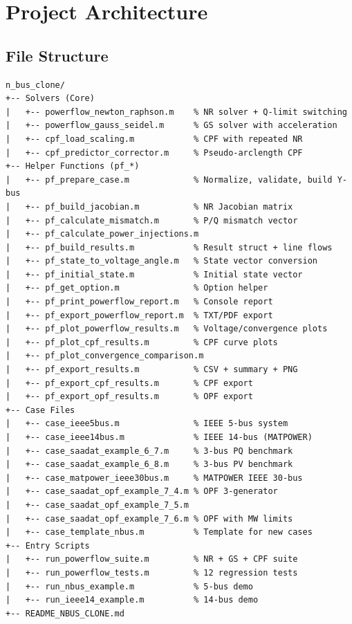 \documentclass[12pt,a4paper]{article}
\begin{document}
\section{Project Architecture}

\subsection{File Structure}

\begin{verbatim}
n_bus_clone/
+-- Solvers (Core)
|   +-- powerflow_newton_raphson.m    % NR solver + Q-limit switching
|   +-- powerflow_gauss_seidel.m      % GS solver with acceleration
|   +-- cpf_load_scaling.m            % CPF with repeated NR
|   +-- cpf_predictor_corrector.m     % Pseudo-arclength CPF
+-- Helper Functions (pf_*)
|   +-- pf_prepare_case.m             % Normalize, validate, build Y-bus
|   +-- pf_build_jacobian.m           % NR Jacobian matrix
|   +-- pf_calculate_mismatch.m       % P/Q mismatch vector
|   +-- pf_calculate_power_injections.m
|   +-- pf_build_results.m            % Result struct + line flows
|   +-- pf_state_to_voltage_angle.m   % State vector conversion
|   +-- pf_initial_state.m            % Initial state vector
|   +-- pf_get_option.m               % Option helper
|   +-- pf_print_powerflow_report.m   % Console report
|   +-- pf_export_powerflow_report.m  % TXT/PDF export
|   +-- pf_plot_powerflow_results.m   % Voltage/convergence plots
|   +-- pf_plot_cpf_results.m         % CPF curve plots
|   +-- pf_plot_convergence_comparison.m
|   +-- pf_export_results.m           % CSV + summary + PNG
|   +-- pf_export_cpf_results.m       % CPF export
|   +-- pf_export_opf_results.m       % OPF export
+-- Case Files
|   +-- case_ieee5bus.m               % IEEE 5-bus system
|   +-- case_ieee14bus.m              % IEEE 14-bus (MATPOWER)
|   +-- case_saadat_example_6_7.m     % 3-bus PQ benchmark
|   +-- case_saadat_example_6_8.m     % 3-bus PV benchmark
|   +-- case_matpower_ieee30bus.m     % MATPOWER IEEE 30-bus
|   +-- case_saadat_opf_example_7_4.m % OPF 3-generator
|   +-- case_saadat_opf_example_7_5.m
|   +-- case_saadat_opf_example_7_6.m % OPF with MW limits
|   +-- case_template_nbus.m          % Template for new cases
+-- Entry Scripts
|   +-- run_powerflow_suite.m         % NR + GS + CPF suite
|   +-- run_powerflow_tests.m         % 12 regression tests
|   +-- run_nbus_example.m            % 5-bus demo
|   +-- run_ieee14_example.m          % 14-bus demo
+-- README_NBUS_CLONE.md
\end{verbatim}
\end{document}
